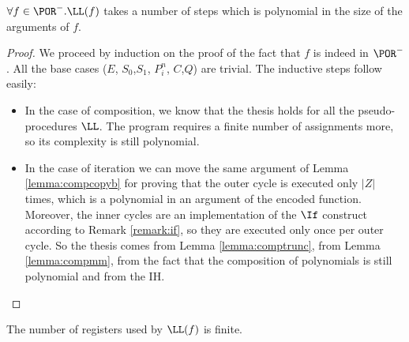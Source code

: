 \begin{prop}
$\forall f \in \POR^-. \LL(f)$ takes a number of steps which is polynomial in the size of the arguments of $f$.
\end{prop}
\begin{proof}
We proceed by induction on the proof of the fact that $f$ is indeed in $\POR^-$. All the base cases ($E$, $S_0$,$S_1$, ${P}^n_i$, $C$,$Q$) are trivial. The inductive steps follow easily:
\begin{itemize}
\item In the case of composition, we know that the thesis holds for all the pseudo-procedures $\LL$. The program requires a finite number of assignments more, so its complexity is still polynomial.
\item In the case of iteration we can move the same argument of Lemma \ref{lemma:compcopyb} for proving that the outer cycle is executed only $|Z|$ times, which is a polynomial in an argument of the encoded function. Moreover, the inner cycles are an implementation of the $\If$ construct according to Remark \ref{remark:if}, so they are executed only once per outer cycle. So the thesis comes from Lemma \ref{lemma:comptrunc}, from Lemma \ref{lemma:compmm}, from the fact that the composition of polynomials is still polynomial and from the IH.
\end{itemize}
\end{proof}

\begin{remark}
The number of registers used by $\LL(f)$ is finite.
\end{remark}

